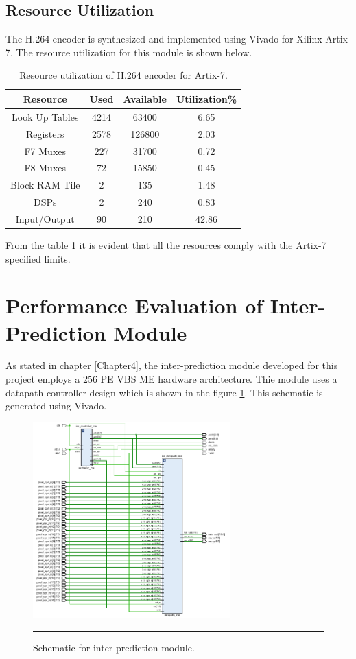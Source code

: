 \subsection{Resource Utilization}
The H.264 encoder is synthesized and implemented using Vivado for Xilinx Artix-7. The resource utilization for this module is shown below.
\begin{table}[H]
	\centering
	\begin{tabular}{|c|c|c|c|} \hline
		\textbf{Resource} & \textbf{Used} & \textbf{Available} & \textbf{Utilization\%}  \\ \hline
		Look Up Tables & 4214 & 63400 & 6.65 \\ \hline
		Registers 	  & 2578 & 126800 & 2.03 \\ \hline
		F7 Muxes      & 227 & 31700 & 0.72 \\ \hline
		F8 Muxes      & 72 & 15850 & 0.45 \\ \hline 
		Block RAM Tile & 2 & 135 & 1.48 \\ \hline
		DSPs & 2 & 240 & 0.83 \\ \hline
		Input/Output   & 90 & 210 & 42.86 \\ \hline 
	\end{tabular}
	\caption{Resource utilization of H.264 encoder for Artix-7.}
	\label{tab:resource_ec}
\end{table}
From the table \ref{tab:resource_ec} it is evident that all the resources comply with the Artix-7 specified limits. 
   
\section{Performance Evaluation of Inter-Prediction Module}
As stated in chapter \ref{Chapter4}, the inter-prediction module developed for this project employs a 256 PE VBS ME hardware architecture. Thie module uses a datapath-controller design which is shown in the figure \ref{fig:mehardware}. This schematic is generated using Vivado. 
\begin{figure}[H]
	\centering
	\includegraphics[width = 3in]{./Figures/mehardware.png}
	\rule{35em}{0.5pt}
	\caption{Schematic for inter-prediction module.}
	\label{fig:mehardware}
\end{figure}
